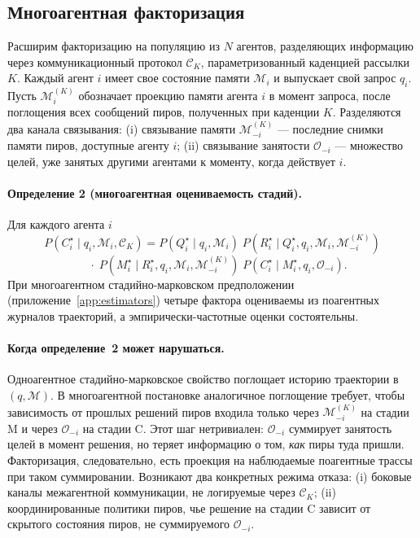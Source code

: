 \documentclass{article}
\begin{document}
\subsection{Многоагентная факторизация}
\label{sec:multi-theory}

Расширим факторизацию на популяцию из $N$ агентов, разделяющих
информацию через коммуникационный протокол $\mathcal{C}_K$,
параметризованный каденцией рассылки $K$. Каждый агент $i$ имеет свое
состояние памяти $\mathcal{M}_i$ и выпускает свой запрос $q_i$. Пусть
$\mathcal{M}_i^{(K)}$ обозначает проекцию памяти агента $i$ в
момент запроса, после поглощения всех сообщений пиров, полученных
при каденции $K$. Разделяются два канала связывания: (i) связывание памяти
$\mathcal{M}_{-i}^{(K)}$ --- последние снимки памяти пиров,
доступные агенту $i$; (ii) связывание занятости $\mathcal{O}_{-i}$ ---
множество целей, уже занятых другими агентами к моменту,
когда действует $i$.

\paragraph{Определение 2 (многоагентная оцениваемость стадий).}
Для каждого агента $i$
\[
P(C^\star_i \mid q_i, \mathcal{M}_i, \mathcal{C}_K)
=
P(Q^\star_i \mid q_i, \mathcal{M}_i)\;
P(R^\star_i \mid Q^\star_i, q_i, \mathcal{M}_i, \mathcal{M}_{-i}^{(K)})
\]
\[
\quad \cdot\;
P(M^\star_i \mid R^\star_i, q_i, \mathcal{M}_i, \mathcal{M}_{-i}^{(K)})\;
P(C^\star_i \mid M^\star_i, q_i, \mathcal{O}_{-i}).
\]
При многоагентном стадийно-марковском предположении
(приложение~\ref{app:estimators}) четыре фактора оцениваемы из
поагентных журналов траекторий, а эмпирически-частотные оценки
состоятельны.

\paragraph{Когда определение~2 может нарушаться.}
Одноагентное стадийно-марковское свойство поглощает историю траектории в
$(q, \mathcal{M})$. В многоагентной постановке аналогичное
поглощение требует, чтобы зависимость от прошлых решений пиров входила только
через $\mathcal{M}_{-i}^{(K)}$ на стадии M и через
$\mathcal{O}_{-i}$ на стадии C. Этот шаг нетривиален:
$\mathcal{O}_{-i}$ суммирует занятость целей в момент решения, но
теряет информацию о том, \emph{как} пиры туда пришли.
Факторизация, следовательно, есть проекция на наблюдаемые поагентные
трассы при таком суммировании. Возникают два конкретных режима отказа: (i)
боковые каналы межагентной коммуникации, не логируемые через
$\mathcal{C}_K$; (ii) координированные политики пиров, чье решение на
стадии C зависит от скрытого состояния пиров, не суммируемого
$\mathcal{O}_{-i}$.
\end{document}

